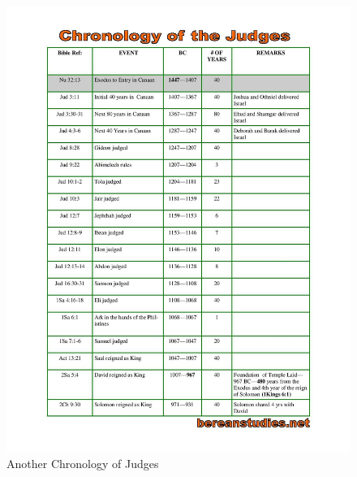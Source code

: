\newpage
\begin{figure}
\begin{center}
\includegraphics[scale=0.6, angle=0]{07OT-Judges/References/4.Chronology2-Judges}
\caption[Another Chronology of Judges]{Another Chronology of Judges}
\label{fig:Another Chronology of Judges}
\end{center}
\end{figure}

